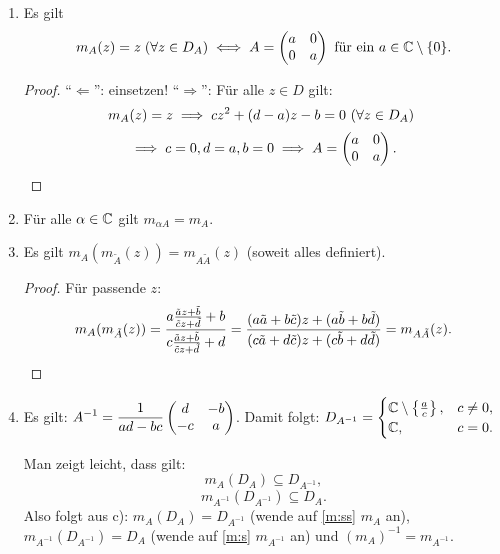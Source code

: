 \documentclass[a4paper,twoside,DIV15,BCOR12mm]{scrbook}
\begin{document}
\begin{enumerate}
\item Es gilt
  \[m_A(z) = z \; (\forall z \in D_A) \iff A = \left(\!\!\!\begin{array}{c c}a&0\\0&a\end{array}\!\!\!\right) \text { für ein } a \in \mathbb{C} \setminus \{0\}.\]
  \begin{proof}
    "`$\Leftarrow$"': einsetzen! "`$\Rightarrow$"': Für alle $z\in D$ gilt:
    \[m_A(z)=z \implies cz^2 + (d-a)z - b = 0 \text{ (}\forall z\in D_A\text{) }\]
    \[\implies c=0, d=a, b=0 \implies A = \left(\!\!\!\begin{array}{c c}a&0\\0&a\end{array}\!\!\!\right). \qedhere\]
  \end{proof}
\item Für alle $\alpha\in\mathbb{C}$ gilt $m_{\alpha A} = m_A$.
\item Es gilt $m_A(m_{\tilde{A}}(z)) = m_{A\tilde{A}}(z)$ (soweit alles definiert).
\begin{proof} Für passende $z$:
  \[m_A(m_{\tilde{A}}(z)) =
  \frac{a\frac{\tilde{a}z+\tilde{b}}{\tilde{c}z+\tilde{d}}+b}{c\frac{\tilde{a}z+\tilde{b}}{\tilde{c}z+\tilde{d}}+d} =
  \frac{(a\tilde{a}+b\tilde{c})z+(a\tilde{b}+b\tilde{d})}{(c\tilde{a}+d\tilde{c})z+(c\tilde{b}+d\tilde{d})} =
  m_{A\tilde{A}}(z). \qedhere\]
\end{proof}
\item Es gilt: $\displaystyle A^{-1} = \frac{1}{ad-bc}\left(\!\!\!\begin{array}{c c}d&-b\\-c&a\end{array}\!\!\!\right)$. Damit folgt: $\displaystyle D_{A^{-1}}=
  \begin{cases} \mathbb{C}\setminus\left\{\frac{a}{c}\right\},&c\neq 0,\\\mathbb{C},&c=0.\end{cases}$

Man zeigt leicht, dass gilt:
\[\label{m:s}m_A(D_A) \subseteq D_{A^{-1}},\tag{$\ast$}\]
\[\label{m:ss}m_{A^{-1}}(D_{A^{-1}}) \subseteq D_A.\tag{$\ast\ast$}\]
Also folgt aus c): $m_A(D_A) = D_{A^{-1}}$ (wende auf \eqref{m:ss} $m_A$ an), $m_{A^{-1}}(D_{A^{-1}}) = D_A$ (wende auf \eqref{m:s} $m_{A^{-1}}$ an) und $(m_A)^{-1} = m_{A^{-1}}$.


\end{enumerate}
\end{document}
